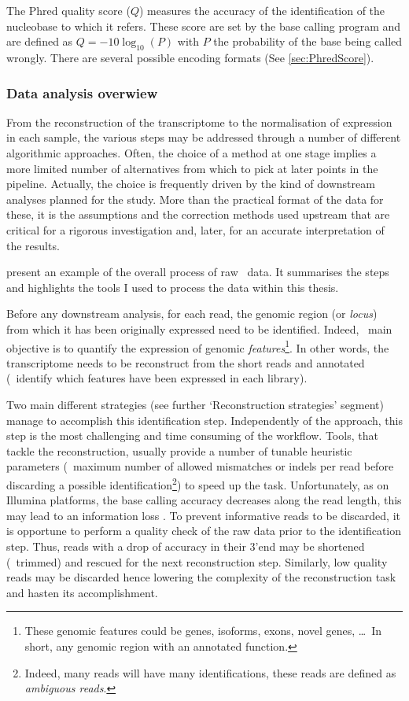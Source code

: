 The \gls{Phred} quality score ($Q$) measures the accuracy of the identification
of the nucleobase to which it refers. These score are set by the base calling
program and are defined as $Q = -10\log_{10}(P)$ with $P$ the probability of
the base being called wrongly. There are several possible encoding formats
(See \cref{sec:PhredScore}).

\subsubsection{Data analysis overwiew}

From the reconstruction of the
transcriptome to the normalisation of expression in each sample, the various
steps may be addressed through a number of different algorithmic approaches.
Often, the choice of a method at one stage implies a more limited number of
alternatives from which to pick at later points in the pipeline. Actually,
the choice is frequently driven by the kind of downstream analyses planned for
the study. More than the practical format of the data for these, it is the
assumptions and the correction methods used upstream that are critical for a
rigorous investigation and, later, for an accurate interpretation of the results.

 present an example of the overall 
process of raw \Rnaseq\ data. It summarises the steps and highlights the tools
I used to process the data within this thesis.

Before any downstream analysis, for each read, the genomic region (or
\emph{locus}) from which it has been originally expressed need to be identified.
Indeed, \Rnaseq\ main objective is to quantify the expression of genomic
\emph{features}\footnote{These genomic features could be genes, isoforms,
exons, novel genes, \dots\
In short, any genomic region with an annotated function.}. In other words,
the transcriptome needs to be reconstruct from the short reads and annotated
(\ie\ identify which features have been expressed in each library).

Two main different strategies (see further `Reconstruction strategies' segment)
manage to accomplish this identification step. Independently of the
approach, this step is the most challenging and time consuming
of the workflow. Tools, that tackle the reconstruction, usually provide a
number of tunable heuristic parameters (\eg\ maximum number of allowed mismatches
or indels per read before discarding a possible identification\footnote{Indeed,
many reads will have many identifications, these reads are defined as
\emph{ambiguous reads}.})
to speed up the task.
Unfortunately, as on Illumina platforms, the base calling accuracy decreases
along the read length, this may lead to an information loss .
To prevent informative reads to be discarded, it is opportune to perform a quality
check of the raw data prior to the identification step. Thus, reads with a drop of
accuracy in their 3'end may be shortened (\ie\ trimmed) and rescued for the next
reconstruction step. Similarly, low quality reads may be discarded hence
lowering the complexity
of the reconstruction task and hasten its accomplishment.

